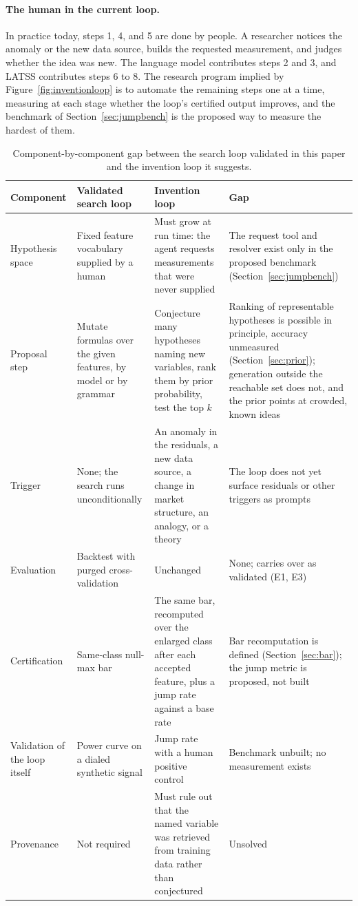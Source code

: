 \documentclass[11pt]{article}
\begin{document}
\paragraph{The human in the current loop.} In practice today, steps 1, 4, and 5 are done by people. A
researcher notices the anomaly or the new data source, builds the requested measurement, and judges
whether the idea was new. The language model contributes steps 2 and 3, and LATSS contributes steps 6 to
8. The research program implied by Figure~\ref{fig:inventionloop} is to automate the remaining steps one
at a time, measuring at each stage whether the loop's certified output improves, and the benchmark of
Section~\ref{sec:jumpbench} is the proposed way to measure the hardest of them.

\begin{table}[htbp]
\centering
\caption{Component-by-component gap between the search loop validated in this paper and the invention
loop it suggests.}
\label{tab:gaps}
\small
\begin{tabular}{p{2.6cm} p{3.9cm} p{3.9cm} p{3.6cm}}
\toprule
Component & Validated search loop & Invention loop & Gap \\
\midrule
Hypothesis space & Fixed feature vocabulary supplied by a human & Must grow at run time: the agent
requests measurements that were never supplied & The request tool and resolver exist only in the proposed
benchmark (Section~\ref{sec:jumpbench}) \\
\addlinespace
Proposal step & Mutate formulas over the given features, by model or by grammar & Conjecture many
hypotheses naming new variables, rank them by prior probability, test the top $k$ & Ranking of representable hypotheses is possible in principle, accuracy unmeasured (Section~\ref{sec:prior});
generation outside the reachable set does not, and the prior points at crowded, known ideas \\
\addlinespace
Trigger & None; the search runs unconditionally & An anomaly in the residuals, a new data source, a
change in market structure, an analogy, or a theory & The loop does not yet surface residuals or other
triggers as prompts \\
\addlinespace
Evaluation & Backtest with purged cross-validation & Unchanged & None; carries over as validated (E1,
E3) \\
\addlinespace
Certification & Same-class null-max bar & The same bar, recomputed over the enlarged class after each
accepted feature, plus a jump rate against a base rate & Bar recomputation is defined
(Section~\ref{sec:bar}); the jump metric is proposed, not built \\
\addlinespace
Validation of the loop itself & Power curve on a dialed synthetic signal & Jump rate with a human
positive control & Benchmark unbuilt; no measurement exists \\
\addlinespace
Provenance & Not required & Must rule out that the named variable was retrieved from training data
rather than conjectured & Unsolved \\
\bottomrule
\end{tabular}
\end{table}
\end{document}
